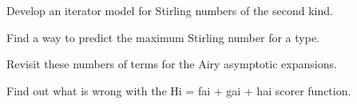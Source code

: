 \begin{DoxyRefList}
Develop an iterator model for Stirling numbers of the second kind.  
\item[\label{todo__todo000014}%
\hypertarget{todo__todo000014}{}%
Member \hyperlink{namespacestd_1_1____detail_a8408f17699eb43a14447c7e4795b277f}{std\+:\+:\+\_\+\+\_\+detail\+:\+:\+\_\+\+\_\+stirling\+\_\+2\+\_\+series} (unsigned int \+\_\+\+\_\+n, unsigned int \+\_\+\+\_\+m)]Find a way to predict the maximum Stirling number for a type.  
\item[\label{todo__todo000007}%
\hypertarget{todo__todo000007}{}%
Member \hyperlink{classstd_1_1____detail_1_1__Airy__asymp_ac64506848c5b2cfd0d90d30bdac33416}{std\+:\+:\+\_\+\+\_\+detail\+:\+:\+\_\+\+Airy\+\_\+asymp$<$ \+\_\+\+Tp $>$\+:\+:\+\_\+\+S\+\_\+absarg\+\_\+lt\+\_\+pio3} (\+\_\+\+Cmplx \+\_\+\+\_\+z) const ]Revisit these numbers of terms for the Airy asymptotic expansions.  
\item[\label{todo__todo000006}%
\hypertarget{todo__todo000006}{}%
Member \hyperlink{classstd_1_1____detail_1_1__Airy__series_a71f68d64f0e202c4f98146f90c6b3298}{std\+:\+:\+\_\+\+\_\+detail\+:\+:\+\_\+\+Airy\+\_\+series$<$ \+\_\+\+Tp $>$\+:\+:\+\_\+\+S\+\_\+\+Scorer} (\+\_\+\+Cmplx \+\_\+\+\_\+t)]Find out what is wrong with the Hi = fai + gai + hai scorer function.
\end{DoxyRefList}